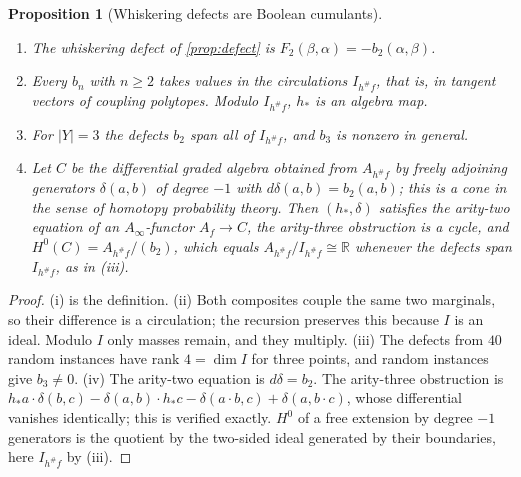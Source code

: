 \documentclass[11pt]{article}
\newtheorem{proposition}[theorem]{Proposition}
\theoremstyle{definition}
\theoremstyle{remark}
\begin{document}
\begin{proposition}[Whiskering defects are Boolean cumulants]\label{prop:boolean}
\leavevmode
\begin{enumerate}[label=(\roman*)]
\item The whiskering defect of \cref{prop:defect} is $F_2(\beta,\alpha)=-b_2(\alpha,\beta)$.
\item Every $b_n$ with $n\ge2$ takes values in the circulations $I_{h^\#f}$, that is, in tangent vectors of coupling
  polytopes. Modulo $I_{h^\#f}$, $h_*$ is an algebra map.
\item For $\lvert Y\rvert=3$ the defects $b_2$ span all of $I_{h^\#f}$, and $b_3$ is nonzero in general.
\item Let $C$ be the differential graded algebra obtained from $A_{h^\#f}$ by freely adjoining generators
  $\delta(a,b)$ of degree $-1$ with $d\delta(a,b)=b_2(a,b)$; this is a cone in the sense of homotopy probability
  theory. Then $(h_*,\delta)$ satisfies the arity-two equation of an $A_\infty$-functor $A_f\to C$, the arity-three
  obstruction is a cycle, and $H^0(C)=A_{h^\#f}/(b_2)$, which equals $A_{h^\#f}/I_{h^\#f}\cong\mathbb{R}$ whenever the defects span $I_{h^\#f}$, as in (iii).
\end{enumerate}
\end{proposition}
\begin{proof}
(i) is the definition. (ii) Both composites couple the same two marginals, so their difference is a
circulation; the recursion preserves this because $I$ is an ideal. Modulo $I$ only masses remain, and they
multiply. (iii) The defects from $40$ random instances have rank $4=\dim I$ for three points, and random
instances give $b_3\ne0$. (iv) The arity-two equation is $d\delta=b_2$. The arity-three obstruction is
$h_*a\cdot\delta(b,c)-\delta(a,b)\cdot h_*c-\delta(a\cdot b,c)+\delta(a,b\cdot c)$, whose differential vanishes
identically; this is verified exactly. $H^0$ of a free extension by degree $-1$ generators is the quotient by
the two-sided ideal generated by their boundaries, here $I_{h^\#f}$ by (iii).
\end{proof}
\end{document}

